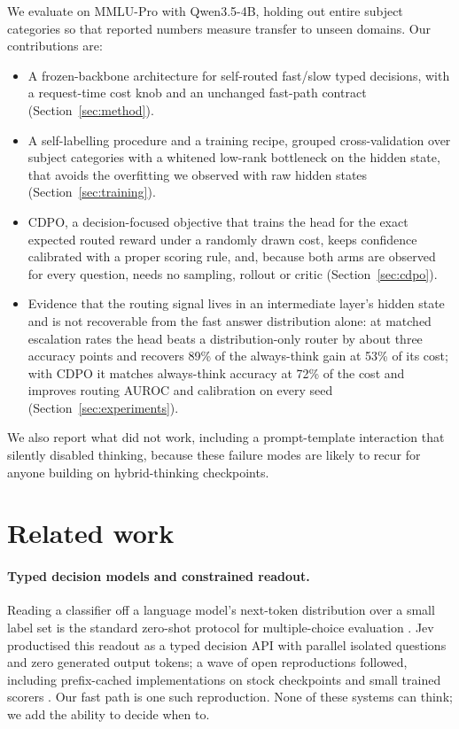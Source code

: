 \documentclass{article}
\newcommand{\cdpo}{CDPO}
\begin{document}
We evaluate on MMLU-Pro with Qwen3.5-4B, holding out entire subject categories so that reported numbers measure transfer to unseen domains. Our contributions are:
\begin{itemize}
  \item A frozen-backbone architecture for self-routed fast/slow typed decisions, with a request-time cost knob and an unchanged fast-path contract (Section~\ref{sec:method}).
  \item A self-labelling procedure and a training recipe, grouped cross-validation over subject categories with a whitened low-rank bottleneck on the hidden state, that avoids the overfitting we observed with raw hidden states (Section~\ref{sec:training}).
  \item \cdpo, a decision-focused objective that trains the head for the exact expected routed reward under a randomly drawn cost, keeps confidence calibrated with a proper scoring rule, and, because both arms are observed for every question, needs no sampling, rollout or critic (Section~\ref{sec:cdpo}).
  \item Evidence that the routing signal lives in an intermediate layer's hidden state and is not recoverable from the fast answer distribution alone: at matched escalation rates the head beats a distribution-only router by about three accuracy points and recovers 89\% of the always-think gain at 53\% of its cost; with \cdpo{} it matches always-think accuracy at 72\% of the cost and improves routing AUROC and calibration on every seed (Section~\ref{sec:experiments}).
\end{itemize}

We also report what did not work, including a prompt-template interaction that silently disabled thinking, because these failure modes are likely to recur for anyone building on hybrid-thinking checkpoints.

\section{Related work}

\paragraph{Typed decision models and constrained readout.}
Reading a classifier off a language model's next-token distribution over a small label set is the standard zero-shot protocol for multiple-choice evaluation \citep{hendrycks2021mmlu,wang2024mmlupro}. Jev \citep{typesafe2026jev} productised this readout as a typed decision API with parallel isolated questions and zero generated output tokens; a wave of open reproductions followed, including prefix-cached implementations on stock checkpoints \citep{ekzhang2026openjevsglang,zhihz2026openjev} and small trained scorers \citep{mapika2026decider}. Our fast path is one such reproduction. None of these systems can think; we add the ability to decide when to.
\end{document}
